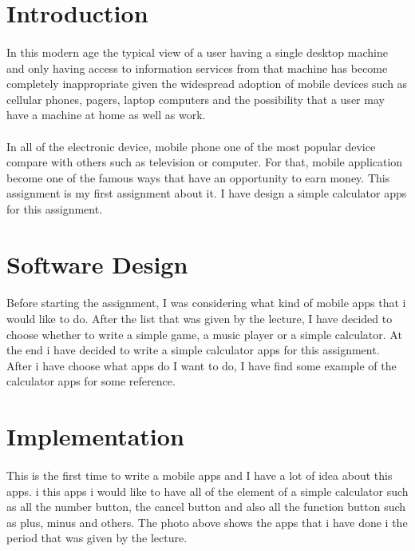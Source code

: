 \documentclass[10pt, a4paper]{article}
\title{\mytitle}
\author{\myauthor\hspace{1em}\\\contact\\Edinburgh Napier University\hspace{0.5em}-\hspace{0.5em}\mymodule}
\date{}
\begin{document}
	\maketitle
	
	\section{Introduction}
	\paragraph{}
	In this modern age the typical view of a user having a single desktop machine and only having access to information services from that machine has become completely
    inappropriate given the widespread adoption of mobile devices such as cellular phones, pagers, laptop computers and the possibility that a user may have a machine at home as well as work.
    \paragraph{}
    In all of the electronic device, mobile phone one of the most popular device compare with others such as television or computer. For that, mobile application become one of the famous ways that have an opportunity to earn money. This assignment is my first assignment about it. I have design a simple calculator apps for this assignment. 
	\section{Software Design}
	\paragraph{}
	Before starting the assignment, I was considering what kind of mobile apps that i would like to do. After the list that was given by the lecture, I have decided to choose whether to write a simple game, a music player or a simple calculator. At the end i have decided to write a simple calculator apps for this assignment. After i have choose what apps do I want to do, I have find some example of the calculator apps for some reference. 

	\section{Implementation}
	\paragraph{}
	This is the first time to write a mobile apps and I have a lot of idea about this apps. i this apps i would like to have all of the element of a simple calculator such as all the number button, the cancel button and also all the function button such as plus, minus and others. The photo above shows the apps that i have done i the period that was given by the lecture.
	
\end{document}
